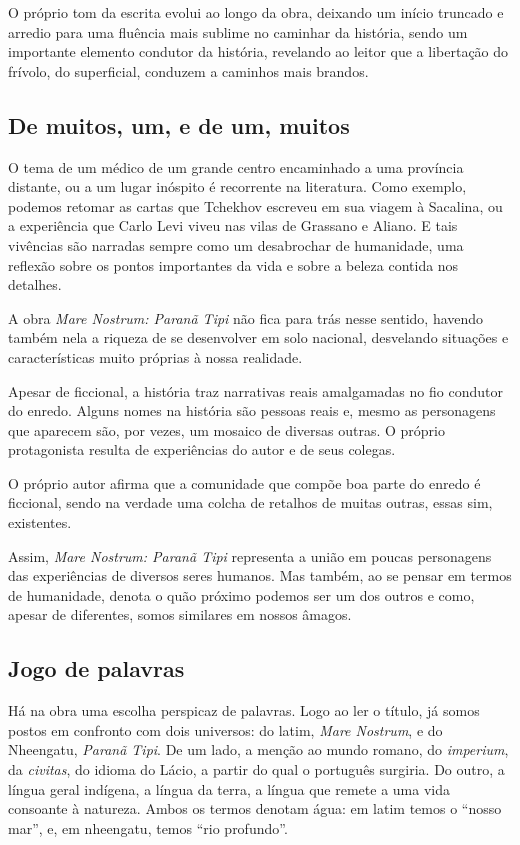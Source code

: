 O próprio tom da escrita evolui ao longo da obra, deixando um início
truncado e arredio para uma fluência mais sublime no caminhar da
história, sendo um importante elemento condutor da história, revelando
ao leitor que a libertação do frívolo, do superficial, conduzem a
caminhos mais brandos.

\subsection{De muitos, um, e de um, muitos}

O tema de um médico de um grande centro encaminhado a uma província
distante, ou a um lugar inóspito é recorrente na literatura. Como
exemplo, podemos retomar as cartas que Tchekhov escreveu em sua viagem à
Sacalina, ou a experiência que Carlo Levi viveu nas vilas de Grassano e
Aliano. E tais vivências são narradas sempre como um desabrochar de
humanidade, uma reflexão sobre os pontos importantes da vida e sobre a
beleza contida nos detalhes.

A obra \textit{Mare Nostrum: Paranã Tipi} não fica para trás nesse sentido,
havendo também nela a riqueza de se desenvolver em solo nacional,
desvelando situações e características muito próprias à nossa realidade.

Apesar de ficcional, a história traz narrativas reais amalgamadas no fio
condutor do enredo. Alguns nomes na história são pessoas reais e, mesmo
as personagens que aparecem são, por vezes, um mosaico de diversas
outras. O próprio protagonista resulta de experiências do autor e de
seus colegas.

O próprio autor afirma que a comunidade que compõe boa parte do enredo é
ficcional, sendo na verdade uma colcha de retalhos de muitas outras,
essas sim, existentes.

Assim, \textit{Mare Nostrum: Paranã Tipi} representa a união em poucas
personagens das experiências de diversos seres humanos. Mas também, ao
se pensar em termos de humanidade, denota o quão próximo podemos ser um
dos outros e como, apesar de diferentes, somos similares em nossos
âmagos.

\subsection{Jogo de palavras}

Há na obra uma escolha perspicaz de palavras. Logo ao ler o título, já
somos postos em confronto com dois universos: do latim, \textit{Mare Nostrum}, e
do Nheengatu, \textit{Paranã Tipi}. De um lado, a menção ao mundo romano, do
\emph{imperium}, da \emph{civitas}, do idioma do Lácio, a partir do qual
o português surgiria. Do outro, a língua geral indígena, a língua da
terra, a língua que remete a uma vida consoante à natureza. Ambos os
termos denotam água: em latim temos o ``nosso mar'', e, em nheengatu, temos
``rio profundo''.

